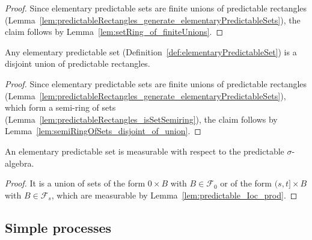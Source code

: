 \begin{proof}
  Since elementary predictable sets are finite unions of predictable rectangles
  (Lemma~\ref{lem:predictableRectangles_generate_elementaryPredictableSets}),
  the claim follows by Lemma~\ref{lem:setRing_of_finiteUnions}.
\end{proof}

\begin{lemma}\label{lem:elementaryPredictableSets_asDisjointUnions}
  Any elementary predictable set (Definition~\ref{def:elementaryPredictableSet})
  is a disjoint union of predictable rectangles.
\end{lemma}

\begin{proof}
  Since elementary predictable sets are finite unions of predictable rectangles
  (Lemma~\ref{lem:predictableRectangles_generate_elementaryPredictableSets}),
  which form a semi-ring of sets (Lemma~\ref{lem:predictableRectangles_isSetSemiring}),
  the claim follows by Lemma~\ref{lem:semiRingOfSets_disjoint_of_union}.
\end{proof}

\begin{lemma}\label{lem:predictableSet_elementaryPredictableSet}
  \leanok
An elementary predictable set is measurable with respect to the predictable $\sigma$-algebra.
\end{lemma}

\begin{proof}
  \leanok
It is a union of sets of the form ${0} \times B$ with $B \in \mathcal{F}_0$ or of the form $(s, t] \times B$ with $B \in \mathcal{F}_s$, which are measurable by Lemma~\ref{lem:predictable_Ioc_prod}.
\end{proof}

\subsection{Simple processes}

